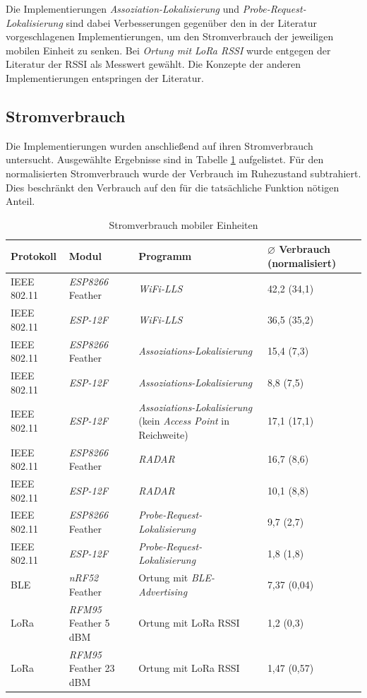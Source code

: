 Die Implementierungen \emph{Assoziation-Lokalisierung} und \emph{Probe-Request-Lokalisierung} sind dabei Verbesserungen gegenüber den in der Literatur vorgeschlagenen Implementierungen, um den Stromverbrauch der jeweiligen mobilen Einheit zu senken.
Bei \emph{Ortung mit LoRa RSSI} wurde entgegen der Literatur der RSSI als Messwert gewählt.
Die Konzepte der anderen Implementierungen entspringen der Literatur.

\subsection{Stromverbrauch}
Die Implementierungen wurden anschließend auf ihren Stromverbrauch untersucht.
Ausgewählte Ergebnisse sind in Tabelle \ref{table:consumptions} aufgelistet.
Für den normalisierten Stromverbrauch wurde der Verbrauch im Ruhezustand subtrahiert. 
Dies beschränkt den Verbrauch auf den für die tatsächliche Funktion nötigen Anteil.

\begin{table}[h]
	\centering
	\caption{Stromverbrauch mobiler Einheiten}
	\label{table:consumptions}
	\begin{tabular}{l|p{3.4cm}|p{5.8cm}|p{2.5cm}}
		Protokoll & Modul & Programm  & $\varnothing$ Verbrauch (normalisiert)\\
		\hline
		IEEE 802.11 & \emph{ESP8266} Feather & \emph{WiFi-LLS} & 42,2 (34,1)\\
		IEEE 802.11 & \emph{ESP-12F} & \emph{WiFi-LLS} & 36,5 (35,2)\\
		IEEE 802.11 & \emph{ESP8266} Feather & \emph{Assoziations-Lokalisierung} & 15,4 (7,3) \\
		IEEE 802.11 & \emph{ESP-12F} & \emph{Assoziations-Lokalisierung} & 8,8 (7,5)\\
		IEEE 802.11 & \emph{ESP-12F} & \emph{Assoziations-Lokalisierung} (kein \emph{Access Point} in Reichweite) & 17,1 (17,1)\\
		\hline
		IEEE 802.11 & \emph{ESP8266} Feather & \emph{RADAR} & 16,7 (8,6)\\
		IEEE 802.11 & \emph{ESP-12F} & \emph{RADAR} & 10,1 (8,8) \\
		IEEE 802.11 & \emph{ESP8266} Feather & \emph{Probe-Request-Lokalisierung} & 9,7 (2,7)\\
		IEEE 802.11 & \emph{ESP-12F} & \emph{Probe-Request-Lokalisierung} & 1,8 (1,8)\\
		\hline
		BLE & \emph{nRF52} Feather & Ortung mit \emph{BLE-Advertising} & 7,37 (0,04)\\
		\hline
		LoRa & \emph{RFM95} Feather 5 dBM & Ortung mit LoRa RSSI & 1,2 (0,3)\\
		LoRa & \emph{RFM95} Feather 23 dBM & Ortung mit LoRa RSSI & 1,47 (0,57)\\
	\end{tabular}
\end{table}


